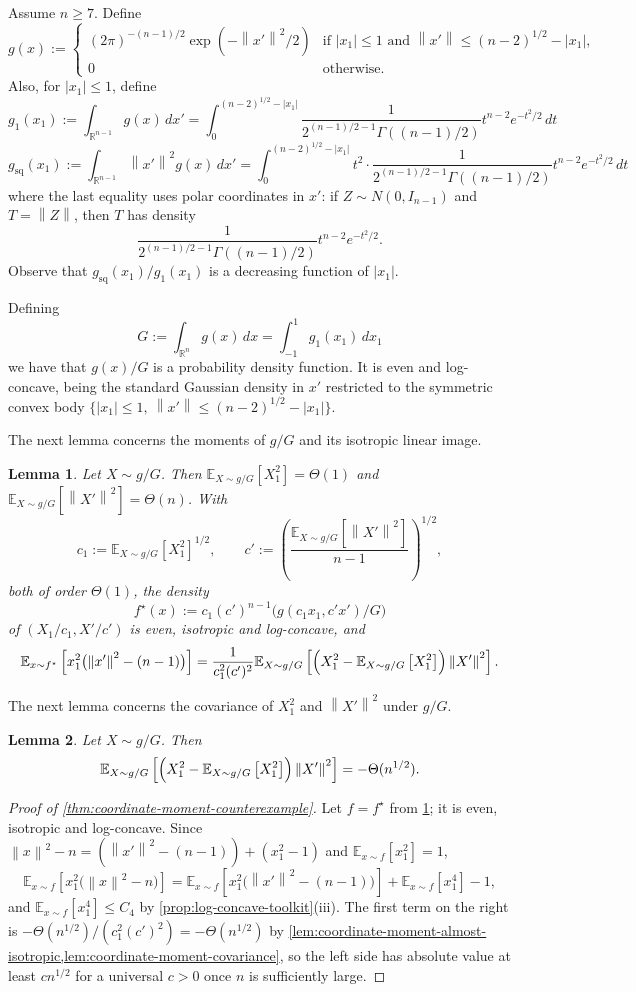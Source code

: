 \documentclass[11pt]{article}
\numberwithin{equation}{section}
\newtheorem{lemma}{Lemma}[section]
\theoremstyle{definition}
\newcommand{\R}{\mathbb{R}}
\newcommand{\E}[2]{\mathbb{E}_{#1}\left[#2\right]}
\newcommand{\norm}[1]{\left\lVert#1\right\rVert}
\begin{document}
Assume $n\ge7$.
Define
\[
g(x):=
\begin{cases}
(2\pi)^{-(n-1)/2}\exp(-\norm{x'}^2/2)&\text{if }|x_1|\le1\text{ and }\norm{x'}\le(n-2)^{1/2}-|x_1|,\\
0&\text{otherwise.}
\end{cases}
\]
Also, for $|x_1|\le1$, define
\[
g_1(x_1)
:=\int_{\R^{n-1}}g(x)\,dx'
=\int_0^{(n-2)^{1/2}-|x_1|} \frac{1}{2^{(n-1)/2-1}\Gamma((n-1)/2)}t^{n-2}e^{-t^2/2}\,dt
\]
\[
g_{\mathrm{sq}}(x_1)
:=\int_{\R^{n-1}}\norm{x'}^2g(x)\,dx'
=\int_0^{(n-2)^{1/2}-|x_1|} t^2\cdot\frac{1}{2^{(n-1)/2-1}\Gamma((n-1)/2)}t^{n-2}e^{-t^2/2}\,dt
\]
where the last equality uses polar coordinates in $x'$: if
$Z\sim N(0,I_{n-1})$ and
$T=\norm{Z}$, then
$T$ has density
\[
\frac{1}{2^{(n-1)/2-1}\Gamma((n-1)/2)}t^{n-2}e^{-t^2/2}.
\]
Observe that $g_{\mathrm{sq}}(x_1)/g_1(x_1)$ is a decreasing function of
$|x_1|$.

Defining
\[
G
:=\int_{\R^n}g(x)\,dx
=\int_{-1}^1g_1(x_1)\,dx_1
\]
we have that $g(x)/G$ is a probability density function.
It is even and log-concave, being the standard Gaussian density in
$x'$ restricted to the symmetric convex body
$\{|x_1|\le1,\ \norm{x'}\le(n-2)^{1/2}-|x_1|\}$.

The next lemma concerns the moments of $g/G$ and its isotropic linear image.

\begin{lemma}
\label{lem:coordinate-moment-almost-isotropic}
Let $X\sim g/G$.
Then $\E{X\sim g/G}{X_1^2}=\Theta(1)$ and
$\E{X\sim g/G}{\norm{X'}^2}=\Theta(n)$.
With
\[
c_1:=\E{X\sim g/G}{X_1^2}^{1/2},
\qquad
c':=\left(\frac{\E{X\sim g/G}{\norm{X'}^2}}{n-1}\right)^{1/2},
\]
both of order $\Theta(1)$, the density
\[
f^\star(x):=c_1(c')^{n-1}\bigl(g(c_1x_1,c'x')/G\bigr)
\]
of $(X_1/c_1,X'/c')$ is even, isotropic and log-concave, and
\[
\E{x\sim f^\star}{x_1^2\bigl(\norm{x'}^2-(n-1)\bigr)}
=\frac{1}{c_1^2(c')^2}
\E{X\sim g/G}{\Bigl(X_1^2-\E{X\sim g/G}{X_1^2}\Bigr)\norm{X'}^2}.
\]
\end{lemma}

The next lemma concerns the covariance of $X_1^2$ and
$\norm{X'}^2$ under
$g/G$.

\begin{lemma}
\label{lem:coordinate-moment-covariance}
Let $X\sim g/G$.
Then
\[
\E{X\sim g/G}{\Bigl(X_1^2-\E{X\sim g/G}{X_1^2}\Bigr)\norm{X'}^2}
=-\Theta(n^{1/2}).
\]
\end{lemma}

\begin{proof}[Proof of \cref{thm:coordinate-moment-counterexample}]
Let $f=f^\star$ from \cref{lem:coordinate-moment-almost-isotropic}; it is even,
isotropic and log-concave.
Since $\norm{x}^2-n=(\norm{x'}^2-(n-1))+(x_1^2-1)$ and
$\E{x\sim f}{x_1^2}=1$,
\[
\E{x\sim f}{x_1^2\bigl(\norm{x}^2-n\bigr)}
=\E{x\sim f}{x_1^2\bigl(\norm{x'}^2-(n-1)\bigr)}
+\E{x\sim f}{x_1^4}-1,
\]
and $\E{x\sim f}{x_1^4}\le C_4$ by \cref{prop:log-concave-toolkit}(iii).
The first term on the right is $-\Theta(n^{1/2})/(c_1^2(c')^2)=-\Theta(n^{1/2})$ by
\cref{lem:coordinate-moment-almost-isotropic,lem:coordinate-moment-covariance},
so the left side has absolute value at least
$cn^{1/2}$ for a universal
$c>0$ once
$n$ is sufficiently large.
\end{proof}
\end{document}
